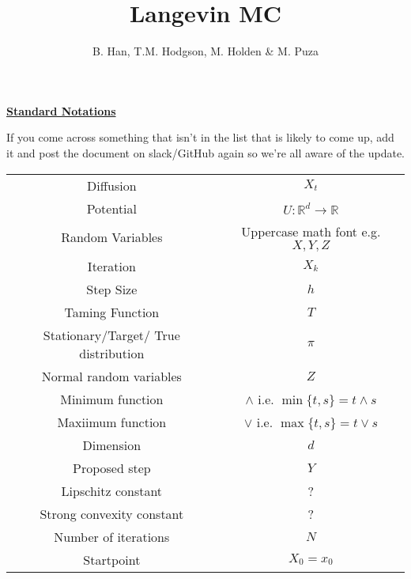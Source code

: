 \documentclass[a4paper]{article}
\title{Langevin MC}
\author{B. Han, T.M. Hodgson, M. Holden \& M. Puza}
\theoremstyle{definition}
\newcommand{\R}{\mathbb{R}}
\begin{document}
	\begin{center}
		{\huge \underline{\textbf{Standard Notations}}}
	\end{center}
If you come across something that isn't in the list that is likely to come up, add it and post the document on slack/GitHub again so we're all aware of the update.
\begin{center}
	\begin{tabular}{cc}
		Diffusion & \(X_t\) \\
		Potential & \( U:\R^d \to  \R \) \\
		Random Variables & Uppercase math font e.g. \(X,Y,Z\) \\
		Iteration & \(X_k\) \\ 
		Step Size & \(h\) \\ 
		Taming Function & \(T\) \\ 
		Stationary/Target/ True distribution & \(\pi\) \\ 
		Normal random variables & \(Z\) \\ 
		Minimum function & \(\wedge\)   i.e. \(\min\lbrace t,s\rbrace = t\wedge s\) \\
		Maxiimum function & \(\vee\)   i.e. \(\max\lbrace t,s\rbrace = t\vee s\) \\  
		Dimension & \(d\) \\ 
		Proposed step & \(Y\) \\ 
		Lipschitz constant & ? \\ 
		Strong convexity constant & ? \\ 
		Number of iterations & \(N\) \\ 
		Startpoint  & \(X_0 = x_0\) \\ 
	\end{tabular} 


\end{center}
\end{document}
